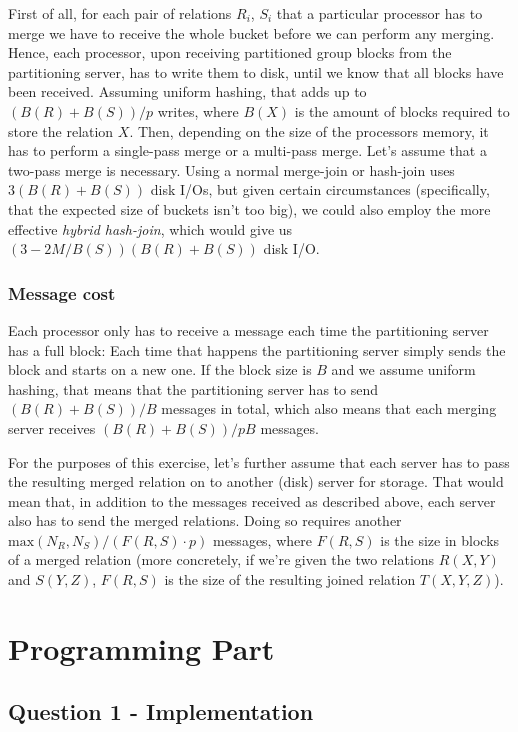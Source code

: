\documentclass[a4paper, 12pt]{article}
\begin{document}
First of all, for each pair of relations $R_i$, $S_i$ that a
particular processor has to merge we have to receive the whole bucket
before we can perform any merging. Hence, each processor, upon
receiving partitioned group blocks from the partitioning server, has
to write them to disk, until we know that all blocks have been
received. Assuming uniform hashing, that adds up to $(B(R) + B(S)) /
p$ writes, where $B(X)$ is the amount of blocks required to store the
relation $X$. Then, depending on the size of the processors memory, it
has to perform a single-pass merge or a multi-pass merge. Let's assume
that a two-pass merge is necessary. Using a normal merge-join or
hash-join uses $3(B(R) + B(S))$ disk I/Os, but given certain
circumstances (specifically, that the expected size of buckets isn't
too big), we could also employ the more effective \emph{hybrid
  hash-join}, which would give us $(3 - 2M/ B(S))(B(R) + B(S))$ disk
I/O.

\subsubsection*{Message cost}

Each processor only has to receive a message each time the
partitioning server has a full block: Each time that happens the
partitioning server simply sends the block and starts on a new one. If
the block size is $B$ and we assume uniform hashing, that means that
the partitioning server has to send $(B(R) + B(S)) / B$ messages in
total, which also means that each merging server receives $(B(R) +
B(S)) / pB$ messages.

For the purposes of this exercise, let's further assume that each
server has to pass the resulting merged relation on to another (disk)
server for storage. That would mean that, in addition to the messages
received as described above, each server also has to send the merged
relations. Doing so requires another $\textrm{max}(N_R, N_S) / (F(R,
S) \cdot p)$ messages, where $F(R,S)$ is the size in blocks of a
merged relation (more concretely, if we're given the two relations
$R(X,Y)$ and $S(Y,Z)$, $F(R,S)$ is the size of the resulting joined
relation $T(X,Y,Z)$).

\section*{Programming Part}

\subsection*{Question 1 - Implementation}
\end{document}
